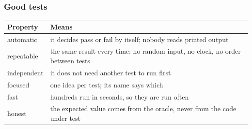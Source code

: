 \documentclass[aspectratio=169,10pt,compress]{beamer}
\begin{document}
\begin{frame}[t,fragile] \frametitle{Good tests}


\begin{table}
		\small
		\begin{tabular}{@{}L{0.20\textwidth}L{0.72\textwidth}@{}}
			\toprule
			\textbf{Property} & \textbf{Means} \\
			\midrule
			automatic    & it decides pass or fail by itself; nobody reads printed output \\
			repeatable   & the same result every time: no random input, no clock, no order between tests \\
			independent  & it does not need another test to run first \\
			focused      & one idea per test; its name says which \\
			fast         & hundreds run in seconds, so they are run often \\
			honest       & the expected value comes from the oracle, never from the code under test \\
			\bottomrule
		\end{tabular}
\end{table}%
\end{frame}




\end{document}
